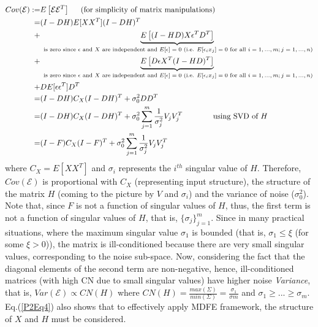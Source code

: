 \begin{equation}\label{P2Eq4}
\begin{aligned}
Cov(\mathcal{E}):= & E\left[ \mathcal{E} \mathcal{E}^{T}  \right]   \hspace{0.5cm} \text{(for simplicity of matrix manipulations)} \\
                 = & (I-DH) E[XX^{T}] (I-DH)^{T} \\
                 + & \underbrace{E\left[ (I-HD)X\epsilon^{T}D^{T}  \right]}_{\tiny{\text{ is zero since $\epsilon$ and $X$ are independent and $E[\epsilon]=0$ (i.e. $E[\epsilon_{i}x_{j}]=0$ for all $i=1,...,m; j=1,...,n$)}}}   \\
                 + & \underbrace{E\left[ D\epsilon X^{T}(I-HD)^{T}  \right]}_{\tiny{\text{ is zero since $\epsilon$ and $X$ are independent and $E[\epsilon]=0$ (i.e. $E[\epsilon_{i}x_{j}]=0$ for all $i=1,...,m; j=1,...,n$)}}}  \\
                 + & D E[\epsilon \epsilon^{T}] D^{T}    \\
                 = & (I-DH) C_{X} (I-DH)^{T} + \sigma^{2}_{0} DD^{T}  \\
                 = & (I-DH) C_{X} (I-DH)^{T} + \sigma^{2}_{0} \sum_{j=1}^{m} \frac{1}{\sigma^{2}_{j}} V_{j}V_{j}^{T} \hspace{0.5in} \text{ using SVD of $H$} \\
                 = & (I-F) C_{X} (I-F)^{T} + \sigma^{2}_{0} \sum_{j=1}^{m} \frac{1}{\sigma^{2}_{j}} V_{j}V_{j}^{T} \hspace{0.5in} \\
\end{aligned}
\end{equation}
where $C_{X} = E[XX^{T}]$ and $\sigma_{i}$ represents the $i^{th}$ singular value of $H$. Therefore, $Cov(\mathcal{E})$ is proportional with $C_{X}$ (representing input structure), the structure of the matrix $H$ (coming to the picture by $V$ and $\sigma_{i}$) and the variance of noise ($\sigma_{0}^{2}$). Note that, since $F$ is not a function of singular values of $H$, thus, the first term is not a function of singular values of $H$, that is, $\{\sigma_{j}\}_{j=1}^{m}$. Since in many practical situations, where the maximum singular value $\sigma_{1}$ is bounded (that is, $\sigma_{1}\leq \xi$ (for some $\xi>0$)), the matrix is ill-conditioned because there are very small singular values, corresponding to the noise sub-space. Now, considering the fact that the diagonal elements of the second term are non-negative, hence, ill-conditioned matrices (with high CN due to small singular values) have higher noise \emph{Variance}, that is, $Var(\mathcal{E}) \propto CN(H)$ where $CN(H)=\frac{max(\Sigma)}{min(\Sigma)}=\frac{\sigma_{1}}{\sigma{m}}$ and $\sigma_{1}\geq ... \geq\sigma_{m}$. Eq.(\ref{P2Eq4}) also shows that to effectively apply MDFE framework, the structure of $X$ and $H$ must be considered.

